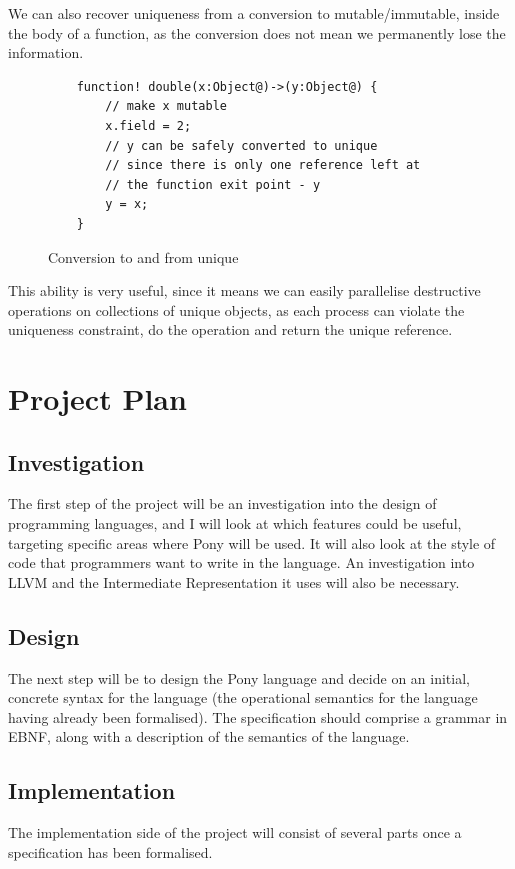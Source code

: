 \documentclass[pdftex,11pt,a4paper]{report}
\begin{document}
We can also recover uniqueness from a conversion to mutable/immutable, inside the body of a function, as the conversion does not mean we permanently lose the information.

\begin{figure}[H]
\begin{verbatim}
    function! double(x:Object@)->(y:Object@) {
        // make x mutable
        x.field = 2;
        // y can be safely converted to unique
        // since there is only one reference left at
        // the function exit point - y
        y = x;
    }
\end{verbatim}
\caption{Conversion to and from unique}
\end{figure}

This ability is very useful, since it means we can easily parallelise destructive operations on collections of unique objects, as each process can violate the uniqueness constraint, do the operation and return the unique reference.

\newpage
\chapter{Project Plan}
\label{chapter:project}

\section{Investigation}
The first step of the project will be an investigation into the design of programming languages, and I will look at which features could be useful, targeting specific areas where Pony will be used.
It will also look at the style of code that programmers want to write in the language.
An investigation into LLVM and the Intermediate Representation it uses will also be necessary.

\section{Design}
The next step will be to design the Pony language and decide on an initial, concrete syntax for the language (the operational semantics for the language having already been formalised).
The specification should comprise a grammar in EBNF, along with a description of the semantics of the language.

\section{Implementation}
The implementation side of the project will consist of several parts once a specification has been formalised.
\end{document}
